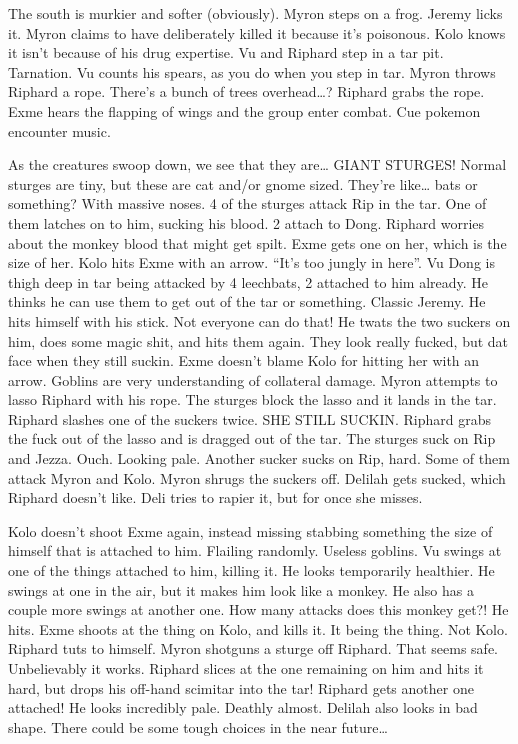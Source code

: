 \begin{multicols}{2}
The south is murkier and softer (obviously). Myron steps on a frog. Jeremy licks it. Myron claims to have deliberately killed it because it’s poisonous. Kolo knows it isn’t because of his drug expertise. Vu and Riphard step in a tar pit. Tarnation. Vu counts his spears, as you do when you step in tar. Myron throws Riphard a rope. There’s a bunch of trees overhead…? Riphard grabs the rope. Exme hears the flapping of wings and the group enter combat. Cue pokemon encounter music. \medskip

As the creatures swoop down, we see that they are… GIANT STURGES! Normal sturges are tiny, but these are cat and/or gnome sized. They’re like… bats or something? With massive noses. 4 of the sturges attack Rip in the tar. One of them latches on to him, sucking his blood. 2 attach to Dong. Riphard worries about the monkey blood that might get spilt. Exme gets one on her, which is the size of her. Kolo hits Exme with an arrow. “It’s too jungly in here”. Vu Dong is thigh deep in tar being attacked by 4 leechbats, 2 attached to him already. He thinks he can use them to get out of the tar or something. Classic Jeremy. He hits himself with his stick. Not everyone can do that! He twats the two suckers on him, does some magic shit, and hits them again. They look really fucked, but dat face when they still suckin. Exme doesn’t blame Kolo for hitting her with an arrow. Goblins are very understanding of collateral damage. Myron attempts to lasso Riphard with his rope. The sturges block the lasso and it lands in the tar. Riphard slashes one of the suckers twice. SHE STILL SUCKIN. Riphard grabs the fuck out of the lasso and is dragged out of the tar. The sturges suck on Rip and Jezza. Ouch. Looking pale. Another sucker sucks on Rip, hard. Some of them attack Myron and Kolo. Myron shrugs the suckers off. Delilah gets sucked, which Riphard doesn’t like. Deli tries to rapier it, but for once she misses.\medskip

Kolo doesn’t shoot Exme again, instead missing stabbing something the size of himself that is attached to him. Flailing randomly. Useless goblins. Vu swings at one of the things attached to him, killing it. He looks temporarily healthier. He swings at one in the air, but it makes him look like a monkey. He also has a couple more swings at another one. How many attacks does this monkey get?! He hits. Exme shoots at the thing on Kolo, and kills it. It being the thing. Not Kolo. Riphard tuts to himself. Myron shotguns a sturge off Riphard. That seems safe. Unbelievably it works. Riphard slices at the one remaining on him and hits it hard, but drops his off-hand scimitar into the tar! Riphard gets another one attached! He looks incredibly pale. Deathly almost. Delilah also looks in bad shape. There could be some tough choices in the near future…\medskip


\end{multicols}
